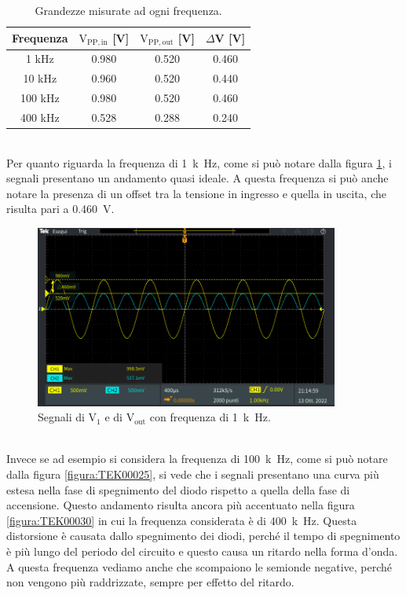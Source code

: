 \documentclass{report}
\begin{document}
\begin{table}[h!]
	\centering
	\begin{tabular}{|c|c|c|c|}
		\hline
		\textbf{Frequenza} & \boldmath$\displaystyle\mathrm{V_{PP,in}}$\textbf{ [V]} & \boldmath$\displaystyle\mathrm{{V_{PP,out}}}$\textbf{ [V]} & \boldmath$\Delta$\textbf{V [V]}\\
		\hline
		1 kHz & 0.980 & 0.520 & 0.460\\
		\hline
		10 kHz & 0.960 & 0.520 & 0.440\\
		\hline
		100 kHz & 0.980 & 0.520 & 0.460\\
		\hline
		400 kHz & 0.528 & 0.288 & 0.240\\
		\hline\end{tabular}
	\caption{Grandezze misurate ad ogni frequenza.}
	\label{table:misure3}
\end{table}
\\Per quanto riguarda la frequenza di \SI{1}{k\hertz}, come si può notare dalla figura \ref{figura:TEK00022}, i segnali presentano un andamento quasi ideale. A questa frequenza si può anche notare la presenza di un offset tra la tensione in ingresso e quella in uscita, che risulta pari a \SI{0.460}{\volt}.
\begin{figure}[h!]
	\centering
	\includegraphics[height=6cm]{immagini/TEK00022}
	\caption{Segnali di $\mathrm{V_1}$ e di $\mathrm{V_{out}}$ con frequenza di \SI{1}{k\hertz}.}
	\label{figura:TEK00022}
\end{figure}
\\Invece se ad esempio si considera la frequenza di \SI{100}{k\hertz}, come si può notare dalla figura \ref{figura:TEK00025}, si vede che i segnali presentano una curva più estesa nella fase di spegnimento del diodo rispetto a quella della fase di accensione. Questo andamento risulta ancora più accentuato nella figura \ref{figura:TEK00030} in cui la frequenza considerata è di \SI{400}{k\hertz}. Questa distorsione è causata dallo spegnimento dei diodi, perché il tempo di spegnimento è più lungo del periodo del circuito e questo causa un ritardo nella forma d'onda. A questa frequenza vediamo anche che scompaiono le semionde negative, perché non vengono più raddrizzate, sempre per effetto del ritardo.
\end{document}
